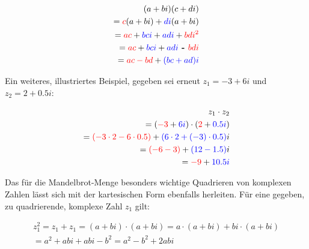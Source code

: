 \begin{equation}\label{eq:complex-numbers-multiplication}
  \begin{split}
    (a + bi)(c + di) \\
    = \begingroup\color{red} c\endgroup (a + bi)
      + \begingroup\color{blue} di\endgroup (a + bi) \\
    = \begingroup\color{red} ac\endgroup
      + \begingroup\color{blue} bci\endgroup
      + \begingroup\color{blue} adi\endgroup
      + \begingroup\color{red} bdi^2\endgroup \\
    = \begingroup\color{red} ac\endgroup
      + \begingroup\color{blue} bci\endgroup
      + \begingroup\color{blue} adi\endgroup
      \textbf{ - } \begingroup\color{red} bdi\endgroup \\
    = \begingroup\color{red} ac - bd\endgroup
      + \begingroup\color{blue}(bc + ad)i\endgroup \\
  \end{split}
\end{equation}

Ein weiteres, illustriertes Beispiel, gegeben sei erneut
\(z_1 = -3 + 6i\) und \(z_2 = 2 + 0.5i\):

\begin{equation}\label{eq:complex-numbers-multiplication-example}
  \begin{split}
    z_1 \cdot z_2 \\
    = (\begingroup\color{red} -3\endgroup + \begingroup\color{blue} 6i\endgroup)
      \cdot (\begingroup\color{red} 2\endgroup + \begingroup\color{blue} 0.5i\endgroup) \\
    = \begingroup\color{red} (-3 \cdot 2 - 6 \cdot 0.5)\endgroup
      + \begingroup\color{blue} (6 \cdot 2 + (-3) \cdot 0.5)\endgroup i \\
    = \begingroup\color{red} (-6 - 3)\endgroup
      + \begingroup\color{blue} (12 - 1.5)\endgroup i \\
    = \begingroup\color{red} -9\endgroup + \begingroup\color{blue} 10.5i\endgroup
  \end{split}
\end{equation}

Das für die Mandelbrot-Menge besonders wichtige Quadrieren von komplexen Zahlen
lässt sich mit der kartesischen Form ebenfalls herleiten.
Für eine gegeben, zu quadrierende, komplexe Zahl \(z_1\) gilt:

\begin{multline}\label{eq:complex-numbes-squaring}
  z_1^2
    = z_1 + z_1
    = (a + bi) \cdot (a + bi)
    = a \cdot (a + bi) + bi \cdot (a + bi) \\
    = a^2 + abi + abi - b^2
    = a^2 - b^2 + 2abi
\end{multline}
